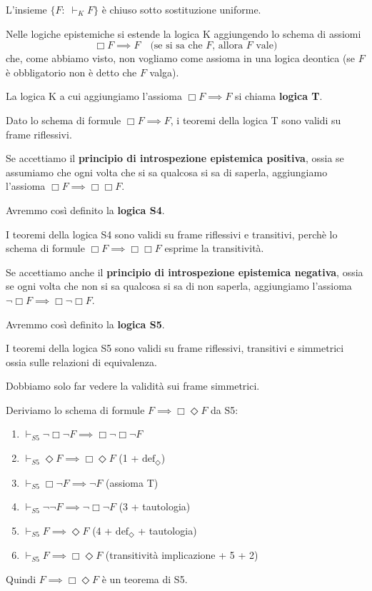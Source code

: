 \documentclass[../main.tex]{subfiles}
\begin{document}
\begin{theorem}
    L'insieme $\{F : \; \vdash_K F\}$ è chiuso sotto sostituzione uniforme.
\end{theorem}

Nelle logiche epistemiche si estende la logica K aggiungendo lo schema di assiomi
\begin{equation*}
    \Box F \implies F \quad \text{(se si sa che $F$, allora $F$ vale)}
\end{equation*}
che, come abbiamo visto, non vogliamo come assioma in una logica deontica (se $F$ è obbligatorio non è detto che $F$ valga).

\begin{definition}[Logica T]
    La logica K a cui aggiungiamo l'assioma $\Box F \implies F$ si chiama \textbf{logica T}.
\end{definition}
Dato lo schema di formule $\Box F \implies F$, i teoremi della logica T sono validi su frame riflessivi.
\begin{definition}[Logica S4]
    Se accettiamo il \textbf{principio di introspezione epistemica positiva}, ossia se assumiamo che ogni volta che si sa qualcosa si sa di saperla, aggiungiamo l'assioma $\Box F \implies \Box \Box F$.

    Avremmo così definito la \textbf{logica S4}.
\end{definition}
I teoremi della logica S4 sono validi su frame riflessivi e transitivi, perchè lo schema di formule $\Box F \implies \Box \Box F$ esprime la transitività.
\begin{definition}[Logica S5]
    Se accettiamo anche il \textbf{principio di introspezione epistemica negativa}, ossia se ogni volta che non si sa qualcosa si sa di non saperla, aggiungiamo l'assioma $\neg \Box F \implies \Box \neg \Box F$.

    Avremmo così definito la \textbf{logica S5}.
\end{definition}
I teoremi della logica S5 sono validi su frame riflessivi, transitivi e simmetrici ossia sulle relazioni di equivalenza.

Dobbiamo solo far vedere la validità sui frame simmetrici.

Deriviamo lo schema di formule $F \implies \Box \Diamond F$ da S5:
\begin{enumerate}[label=\arabic*)]
    \item $\vdash_{S5} \neg \Box \neg F \implies \Box \neg \Box \neg F$
    \item $\vdash_{S5} \Diamond F \implies \Box \Diamond F$ (1 + $\text{def}_\Diamond$)
    \item $\vdash_{S5} \Box \neg F \implies \neg F$ (assioma T)
    \item $\vdash_{S5} \neg \neg F \implies \neg \Box \neg F$ (3 + tautologia)
    \item $\vdash_{S5} F \implies \Diamond F$ (4 + $\text{def}_\Diamond$ + tautologia)
    \item $\vdash_{S5} F \implies \Box \Diamond F$ (transitività implicazione + 5 + 2)
\end{enumerate}
Quindi $F \implies \Box \Diamond F$ è un teorema di S5.
\end{document}
